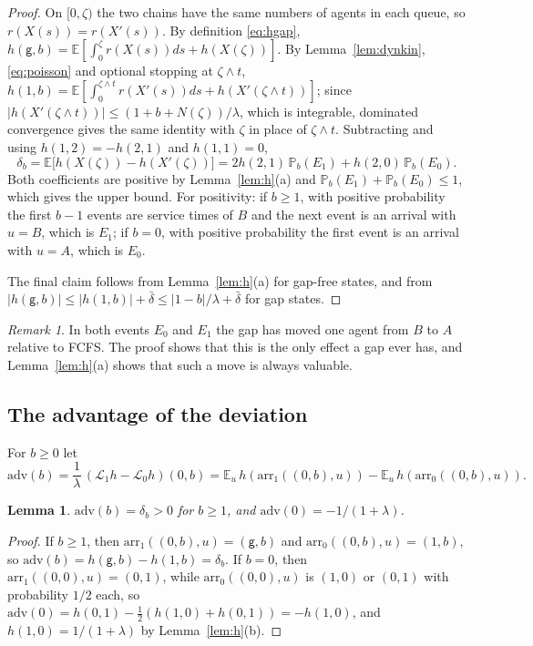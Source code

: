 \documentclass[11pt]{article}
\newtheorem{blem}[bthm]{Lemma}
\theoremstyle{definition}
\theoremstyle{remark}
\newtheorem{brem}[bthm]{Remark}
\newcommand{\E}{\mathbb{E}}
\renewcommand{\Pr}{\mathbb{P}}
\newcommand{\cL}{\mathcal{L}}
\newcommand{\gp}{\mathsf{g}}
\begin{document}
\begin{proof}
On $[0,\zeta)$ the two chains have the same numbers of agents in each queue, so
$r(X(s))=r(X'(s))$. By definition \eqref{eq:hgap},
$h(\gp,b)=\E[\int_0^\zeta r(X(s))ds+h(X(\zeta))]$. By
Lemma~\ref{lem:dynkin}, \eqref{eq:poisson} and optional stopping at
$\zeta\wedge t$,
$h(1,b)=\E[\int_0^{\zeta\wedge t}r(X'(s))ds+h(X'(\zeta\wedge t))]$; since
$|h(X'(\zeta\wedge t))|\le(1+b+N(\zeta))/\lambda$, which is integrable,
dominated convergence gives the same identity with $\zeta$ in place of
$\zeta\wedge t$. Subtracting and using $h(1,2)=-h(2,1)$ and $h(1,1)=0$,
\[
  \delta_b=\E\bigl[h(X(\zeta))-h(X'(\zeta))\bigr]
  =2h(2,1)\,\Pr_b(E_1)+h(2,0)\,\Pr_b(E_0).
\]
Both coefficients are positive by Lemma~\ref{lem:h}(a) and
$\Pr_b(E_1)+\Pr_b(E_0)\le1$, which gives the upper bound. For positivity: if
$b\ge1$, with positive probability the first $b-1$ events are service times of
$B$ and the next event is an arrival with $u=B$, which is $E_1$; if $b=0$, with
positive probability the first event is an arrival with $u=A$, which is $E_0$.

The final claim follows from Lemma~\ref{lem:h}(a) for gap-free states, and from
$|h(\gp,b)|\le|h(1,b)|+\bar\delta\le|1-b|/\lambda+\bar\delta$ for gap states.
\end{proof}

\begin{brem}
In both events $E_0$ and $E_1$ the gap has moved one agent from $B$ to $A$
relative to FCFS. The proof shows that this is the only effect a gap ever has,
and Lemma~\ref{lem:h}(a) shows that such a move is always valuable.
\end{brem}

\subsection{The advantage of the deviation}

For $b\ge0$ let
\[
  \mathrm{adv}(b)=\frac{1}{\lambda}\,(\cL_1h-\cL_0h)(0,b)
  =\E_u\,h(\mathrm{arr}_1((0,b),u))-\E_u\,h(\mathrm{arr}_0((0,b),u)).
\]

\begin{blem}\label{lem:adv}
$\mathrm{adv}(b)=\delta_b>0$ for $b\ge1$, and
$\mathrm{adv}(0)=-1/(1+\lambda)$.
\end{blem}

\begin{proof}
If $b\ge1$, then $\mathrm{arr}_1((0,b),u)=(\gp,b)$ and
$\mathrm{arr}_0((0,b),u)=(1,b)$, so $\mathrm{adv}(b)=h(\gp,b)-h(1,b)=\delta_b$.
If $b=0$, then $\mathrm{arr}_1((0,0),u)=(0,1)$, while
$\mathrm{arr}_0((0,0),u)$ is $(1,0)$ or $(0,1)$ with probability $1/2$ each, so
$\mathrm{adv}(0)=h(0,1)-\tfrac12(h(1,0)+h(0,1))=-h(1,0)$, and
$h(1,0)=1/(1+\lambda)$ by Lemma~\ref{lem:h}(b).
\end{proof}
\end{document}
